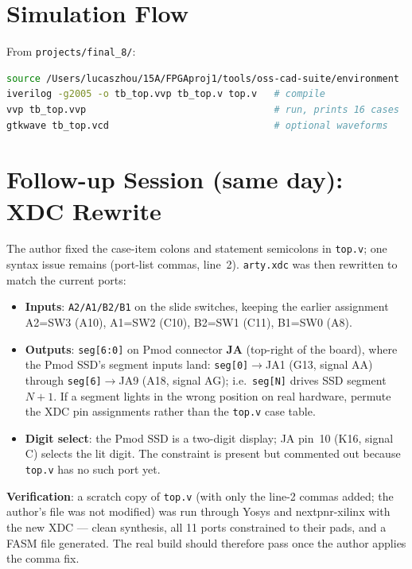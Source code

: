\documentclass[11pt]{article}
\begin{document}
\section{Simulation Flow}
From \texttt{projects/final\_8/}:
\begin{lstlisting}[language=bash]
source /Users/lucaszhou/15A/FPGAproj1/tools/oss-cad-suite/environment
iverilog -g2005 -o tb_top.vvp tb_top.v top.v   # compile
vvp tb_top.vvp                                 # run, prints 16 cases
gtkwave tb_top.vcd                             # optional waveforms
\end{lstlisting}

\section{Follow-up Session (same day): XDC Rewrite}

The author fixed the case-item colons and statement semicolons in
\texttt{top.v}; one syntax issue remains (port-list commas, line~2).
\texttt{arty.xdc} was then rewritten to match the current ports:

\begin{itemize}
  \item \textbf{Inputs}: \texttt{A2/A1/B2/B1} on the slide switches,
        keeping the earlier assignment A2=SW3 (A10), A1=SW2 (C10),
        B2=SW1 (C11), B1=SW0 (A8).
  \item \textbf{Outputs}: \texttt{seg[6:0]} on Pmod connector \textbf{JA}
        (top-right of the board), where the Pmod SSD's segment inputs land:
        \texttt{seg[0]}$\to$JA1 (G13, signal AA) through
        \texttt{seg[6]}$\to$JA9 (A18, signal AG); i.e.\ \texttt{seg[N]}
        drives SSD segment $N{+}1$. If a segment lights in the wrong
        position on real hardware, permute the XDC pin assignments rather
        than the \texttt{top.v} case table.
  \item \textbf{Digit select}: the Pmod SSD is a two-digit display; JA
        pin~10 (K16, signal C) selects the lit digit. The constraint is
        present but commented out because \texttt{top.v} has no such port
        yet.
\end{itemize}

\textbf{Verification}: a scratch copy of \texttt{top.v} (with only the
line-2 commas added; the author's file was not modified) was run through
Yosys and nextpnr-xilinx with the new XDC --- clean synthesis, all 11
ports constrained to their pads, and a FASM file generated. The real
build should therefore pass once the author applies the comma fix.
\end{document}
